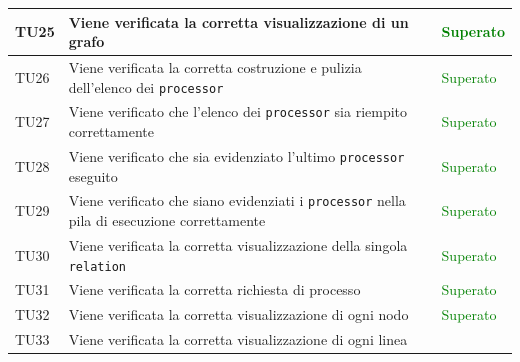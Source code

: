 \documentclass[openany,12pt,a4paper]{report}
\begin{document}
\begin{longtable}[c]{| p{2.5cm} |p{8cm} | p{2.5cm} |}
	\hline
	\newline TU25&
	\newline Viene verificata la corretta visualizzazione di un grafo&
	\newline \textcolor{green}{Superato}
	\\[1em]
	\hline
	\newline TU26&
	\newline Viene verificata la corretta costruzione e pulizia dell'elenco dei \verb|processor|&
	\newline \textcolor{green}{Superato}
	\\[1em]
	\hline
	\newline TU27&
	\newline Viene verificato che l'elenco dei \verb|processor| sia riempito correttamente&
	\newline \textcolor{green}{Superato}
	\\[1em]
	\hline
	\newline TU28&
	\newline Viene verificato che sia evidenziato l'ultimo \verb|processor| eseguito&
	\newline \textcolor{green}{Superato}
	\\[1em]
	\hline
	\newline TU29&
	\newline Viene verificato che siano evidenziati i \verb|processor| nella pila di esecuzione correttamente&
	\newline \textcolor{green}{Superato}
	\\[1em]
	\hline
	\newline TU30&
	\newline Viene verificata la corretta visualizzazione della singola \verb|relation|&
	\newline \textcolor{green}{Superato}
	\\[1em]
	\hline
	\newline TU31&
	\newline Viene verificata la corretta richiesta di processo&
	\newline \textcolor{green}{Superato}
	\\[1em]
	\hline
	\newline TU32&
	\newline Viene verificata la corretta visualizzazione di ogni nodo&
	\newline \textcolor{green}{Superato}
	\\[1em]
	\hline
	\newline TU33&
	\newline Viene verificata la corretta visualizzazione di ogni linea&

\end{longtable}
\end{document}
